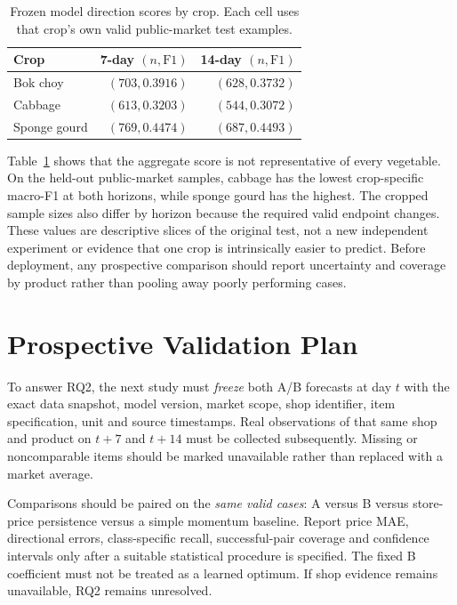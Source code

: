 \documentclass[conference]{IEEEtran}
\begin{document}
\begin{table}[!t]
\centering
\caption{Frozen model direction scores by crop. Each cell uses that crop's own valid public-market test examples.}
\label{tab:bycrop}
\small
\begin{tabularx}{\columnwidth}{@{}>{\raggedright\arraybackslash}Xrr@{}}
\toprule
Crop & 7-day $(n,\mathrm{F1})$ & 14-day $(n,\mathrm{F1})$\\
\midrule
Bok choy & $(703,0.3916)$ & $(628,0.3732)$\\
Cabbage & $(613,0.3203)$ & $(544,0.3072)$\\
Sponge gourd & $(769,0.4474)$ & $(687,0.4493)$\\
\bottomrule
\end{tabularx}
\end{table}

Table~\ref{tab:bycrop} shows that the aggregate score is not representative of every vegetable. On the held-out public-market samples, cabbage has the lowest crop-specific macro-F1 at both horizons, while sponge gourd has the highest. The cropped sample sizes also differ by horizon because the required valid endpoint changes. These values are descriptive slices of the original test, not a new independent experiment or evidence that one crop is intrinsically easier to predict. Before deployment, any prospective comparison should report uncertainty and coverage by product rather than pooling away poorly performing cases.

\section{Prospective Validation Plan}
To answer RQ2, the next study must \emph{freeze} both A/B forecasts at day $t$ with the exact data snapshot, model version, market scope, shop identifier, item specification, unit and source timestamps. Real observations of that same shop and product on $t+7$ and $t+14$ must be collected subsequently. Missing or noncomparable items should be marked unavailable rather than replaced with a market average.

Comparisons should be paired on the \emph{same valid cases}: A versus B versus store-price persistence versus a simple momentum baseline. Report price MAE, directional errors, class-specific recall, successful-pair coverage and confidence intervals only after a suitable statistical procedure is specified. The fixed B coefficient must not be treated as a learned optimum. If shop evidence remains unavailable, RQ2 remains unresolved.
\end{document}
